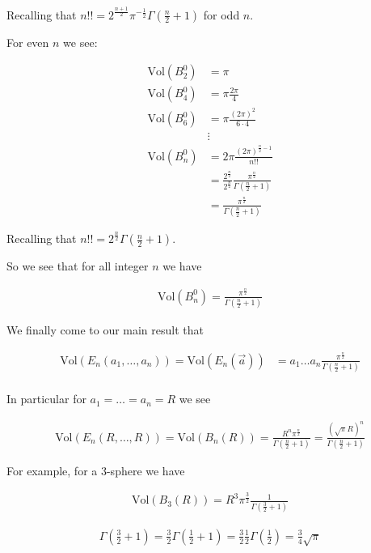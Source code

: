 \documentclass[12pt]{article}
\begin{document}
Recalling that $n!! = 2^{\frac{n+1}{2}} \pi^{-\frac{1}{2}} \Gamma\left(\frac{n}{2}+1\right)$ for odd $n$.

For even $n$ we see:

\begin{align}
\text{Vol}(B_2^0) &= \pi\\
\text{Vol}(B_4^0) &= \pi \frac{2\pi}{4}\\
\text{Vol}(B_6^0) &= \pi \frac{(2\pi)^2}{6\cdot 4}\\
&\vdots\\
\text{Vol}(B_{n}^0) &= 2\pi \frac{(2\pi)^{\frac{n}{2}-1}}{n!!}\\
&= \frac{2^{\frac{n}{2}}}{2^{\frac{n}{2}}} \frac{\pi^{\frac{n}{2}}}{\Gamma\left(\frac{n}{2}+1\right)}\\
&= \frac{\pi^{\frac{n}{2}}}{\Gamma\left(\frac{n}{2}+1\right)}
\end{align}

Recalling that $n!! = 2^{\frac{n}{2}}\Gamma\left(\frac{n}{2}+1\right)$.

So we see that for all integer $n$ we have

\begin{align}
\text{Vol}(B_n^0) = \frac{\pi^{\frac{n}{2}}}{\Gamma\left(\frac{n}{2}+1\right)}
\end{align}

We finally come to our main result that

\begin{align}
\text{Vol}(E_n(a_1,\ldots,a_n)) = \text{Vol}(E_n(\vec{a})) &= a_1\ldots a_n \frac{\pi^{\frac{n}{2}}}{\Gamma\left(\frac{n}{2}+1\right)}\\
\end{align}

In particular for $a_1=\ldots=a_n=R$ we see

\begin{align}
\text{Vol}(E_n(R,\ldots,R)) = \text{Vol}(B_n(R)) = \frac{R^n \pi^{\frac{n}{2}}}{\Gamma\left(\frac{n}{2}+1\right)} = \frac{(\sqrt{\pi}R)^n}{\Gamma\left(\frac{n}{2}+1\right)}
\end{align}

For example, for a $3$-sphere we have

\begin{align}
\text{Vol}(B_3(R)) = R^3 \pi^{\frac{3}{2}} \frac{1}{\Gamma\left(\frac{3}{2}+1\right)}
\end{align}

\begin{align}
\Gamma\left(\frac{3}{2}+1\right) = \frac{3}{2}\Gamma\left(\frac{1}{2}+1\right) = \frac{3}{2}\frac{1}{2}\Gamma\left(\frac{1}{2}\right) = \frac{3}{4} \sqrt{\pi}
\end{align}
\end{document}

